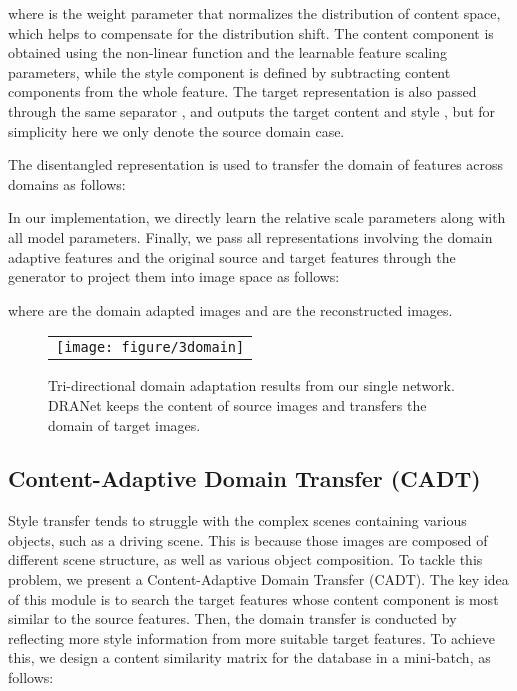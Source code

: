 \documentclass[final]{cvpr}
\begin{document}
where  is the weight parameter that normalizes the distribution of content space, which helps to compensate for the distribution shift.
The content component is obtained using the non-linear function and the learnable feature scaling parameters, while the style component is defined by subtracting content components from the whole feature.
The target representation  is also passed through the same separator , and outputs the target content and style , but for simplicity here we only denote the source domain case.

The disentangled representation is used to transfer the domain of features across domains as follows:

In our implementation, we directly learn the relative scale parameters  along with all model parameters.
Finally, we pass all representations involving the domain adaptive features  and the original source and target features  through the generator  to project them into image space as follows:

where  are the domain adapted images and  are the reconstructed images.

\begin{figure}[t] 
	\centering
	\begin{tabular}{c@{\hspace{1mm}}}
    \texttt{[image: figure/3domain]}
\end{tabular}
	\caption{Tri-directional domain adaptation results from our single network. DRANet keeps the content of source images and transfers the domain of target images.}
	\label{fig:3domain}
	\vspace{-3mm}
\end{figure}


\subsection{Content-Adaptive Domain Transfer (CADT) }
Style transfer tends to struggle with the complex scenes containing various objects, such as a driving scene.
This is because those images are composed of different scene structure, as well as various object composition.
To tackle this problem, we present a Content-Adaptive Domain Transfer (CADT).
The key idea of this module is to search the target features whose content component is most similar to the source features.
Then, the domain transfer is conducted by reflecting more style information from more suitable target features.
To achieve this, we design a content similarity matrix for the database in a mini-batch, as follows:
\end{document}
